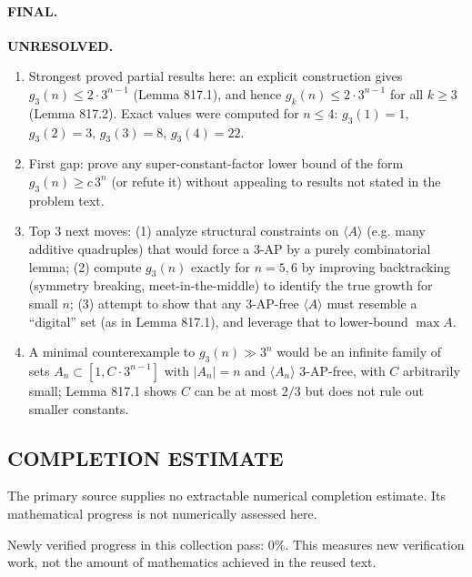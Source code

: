 \paragraph{FINAL.} \textbf{UNRESOLVED.}
\begin{enumerate}
\item[(i)] Strongest proved partial results here: an explicit construction gives $g_3(n)\le 2\cdot 3^{n-1}$ (Lemma 817.1), and hence $g_k(n)\le 2\cdot 3^{n-1}$ for all $k\ge3$ (Lemma 817.2). Exact values were computed for $n\le4$: $g_3(1)=1$, $g_3(2)=3$, $g_3(3)=8$, $g_3(4)=22$.
\item[(ii)] First gap: prove any super-constant-factor lower bound of the form $g_3(n)\ge c\,3^n$ (or refute it) without appealing to results not stated in the problem text.
\item[(iii)] Top 3 next moves: (1) analyze structural constraints on $\langle A\rangle$ (e.g. many additive quadruples) that would force a 3-AP by a purely combinatorial lemma; (2) compute $g_3(n)$ exactly for $n=5,6$ by improving backtracking (symmetry breaking, meet-in-the-middle) to identify the true growth for small $n$; (3) attempt to show that any 3-AP-free $\langle A\rangle$ must resemble a ``digital'' set (as in Lemma 817.1), and leverage that to lower-bound $\max A$.
\item[(iv)] A minimal counterexample to $g_3(n)\gg 3^n$ would be an infinite family of sets $A_n\subset[1,C\cdot 3^{n-1}]$ with $|A_n|=n$ and $\langle A_n\rangle$ 3-AP-free, with $C$ arbitrarily small; Lemma 817.1 shows $C$ can be at most $2/3$ but does not rule out smaller constants.
\end{enumerate}




\subsection*{COMPLETION ESTIMATE}
The primary source supplies no extractable numerical completion estimate. Its mathematical progress is not numerically assessed here.

Newly verified progress in this collection pass: $0\%$. This measures new verification work, not the amount of mathematics achieved in the reused text.
